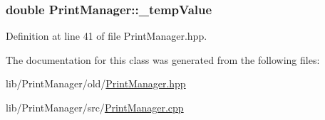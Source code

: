 \subsubsection[{\texorpdfstring{\+\_\+temp\+Value}{_tempValue}}]{\setlength{\rightskip}{0pt plus 5cm}double Print\+Manager\+::\+\_\+temp\+Value\hspace{0.3cm}{\ttfamily [protected]}}\hypertarget{class_print_manager_a550ad6ba340af9c4f689b8e25bd420f3}{}\label{class_print_manager_a550ad6ba340af9c4f689b8e25bd420f3}


Definition at line 41 of file Print\+Manager.\+hpp.



The documentation for this class was generated from the following files\+:\begin{DoxyCompactItemize}
\item 
lib/\+Print\+Manager/old/\hyperlink{old_2_print_manager_8hpp}{Print\+Manager.\+hpp}\item 
lib/\+Print\+Manager/src/\hyperlink{src_2_print_manager_8cpp}{Print\+Manager.\+cpp}\end{DoxyCompactItemize}
